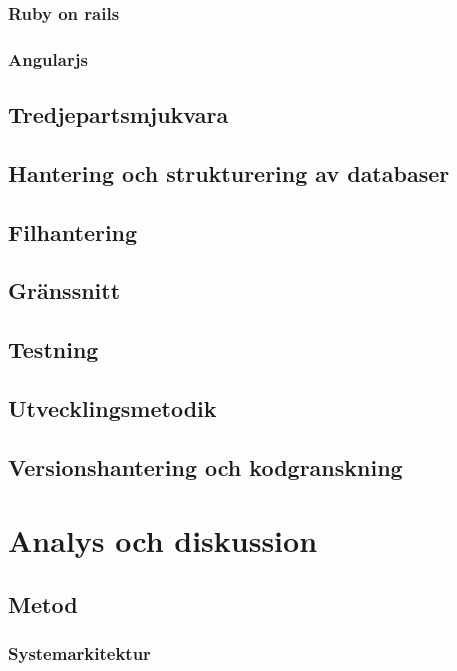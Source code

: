 \documentclass[a4paper,12pt,oneside,final]{extbook}
\begin{document}
\subsection{Ruby on rails}

\subsection{Angularjs}

\section{Tredjepartsmjukvara}

\section{Hantering och strukturering av databaser}

\section{Filhantering}

\section{Gränssnitt}

\section{Testning}

\section{Utvecklingsmetodik}

\section{Versionshantering och kodgranskning}

\chapter{Analys och diskussion}

\section{Metod}

\subsection{Systemarkitektur}
\end{document}

